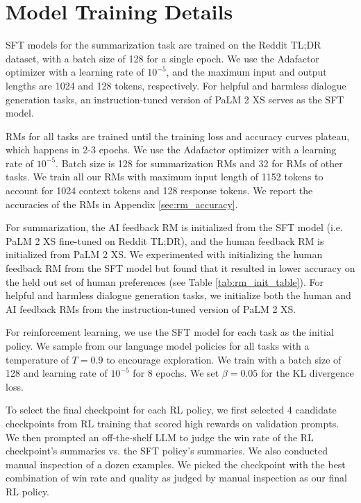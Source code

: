 \documentclass[11pt]{article}
\begin{document}
\section{Model Training Details}
\label{sec:model_training_details}
SFT models for the summarization task are trained on the Reddit TL;DR dataset, with a batch size of 128 for a single epoch. We use the Adafactor~\citep{adafactor} optimizer with a learning rate of $ 10^{-5}$, and the maximum input and output lengths are 1024 and 128 tokens, respectively. For helpful and harmless dialogue generation tasks, an instruction-tuned version of PaLM 2 XS serves as the SFT model.

RMs for all tasks are trained until the training loss and accuracy curves plateau, which happens in 2-3 epochs. We use the Adafactor optimizer with a learning rate of $10^{-5}$. Batch size is 128 for summarization RMs and 32 for RMs of other tasks. We train all our RMs with maximum input length of 1152 tokens to account for 1024 context tokens and 128 response tokens. We report the accuracies of the RMs in Appendix \ref{sec:rm_accuracy}.

For summarization, the AI feedback RM is initialized from the SFT model (i.e. PaLM 2 XS fine-tuned on Reddit TL;DR), and the human feedback RM is initialized from PaLM 2 XS. We experimented with initializing the human feedback RM from the SFT model but found that it resulted in lower accuracy on the held out set of human preferences (see Table \ref{tab:rm_init_table}). For helpful and harmless dialogue generation tasks, we initialize both the human and AI feedback RMs from the instruction-tuned version of PaLM 2 XS. 


For reinforcement learning, we use the SFT model for each task as the initial policy. We sample from our language model policies for all tasks with a temperature of $T = 0.9$ to encourage exploration. We train with a batch size of 128 and learning rate of $10^{-5}$ for 8 epochs. We set $\beta = 0.05$ for the KL divergence loss. 

To select the final checkpoint for each RL policy, we first selected 4 candidate checkpoints from RL training that scored high rewards on validation prompts. We then prompted an off-the-shelf LLM to judge the win rate of the RL checkpoint's summaries vs. the SFT policy's summaries. We also conducted manual inspection of a dozen examples. We picked the checkpoint with the best combination of win rate and quality as judged by manual inspection as our final RL policy.
\end{document}
